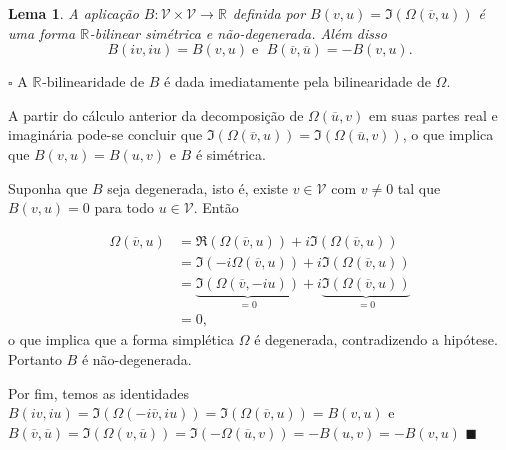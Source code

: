 \documentclass[12pt]{book}
\newtheorem{lema}[teorema]{Lema}
\newenvironment{prova}[1]{$\square$ #1}{\hfill$\blacksquare$}
\newcommand{\complexificado}[1]{\mathcal{#1}}
\newcommand{\formaSimpleticaExtendida}[2]{\Omega(#1, #2)}
\newcommand{\parteImaginaria}[1]{\Im(#1)}
\newcommand{\parteReal}[1]{\Re(#1)}
\newcommand{\real}[1]{\mathbb{R}^{#1}}
\newcommand{\reta}{\real{}}
\begin{document}
	\begin{lema}
		A aplicação $B:\complexificado{V}\times \complexificado{V} \to \reta$ definida por $B(v, u ) = \parteImaginaria{\formaSimpleticaExtendida{\overline{v}}{u}}$ é uma forma $\reta$-bilinear simétrica e não-degenerada. Além disso
		$$
		B(iv,iu) = B(v,u)\;\text{e }\;B(\overline{v},\overline{u})=-B(v,u).
		$$
	\end{lema}
	\begin{prova} 
		A $\reta$-bilinearidade de $B$ é dada imediatamente pela bilinearidade de $\Omega$. 
		
		A partir do cálculo anterior da decomposição de $\formaSimpleticaExtendida{\overline{u}}{v} $ em suas partes real e imaginária pode-se concluir que $\parteImaginaria{\formaSimpleticaExtendida{\overline{v}}{u} } = \parteImaginaria{\formaSimpleticaExtendida{\overline{u}}{v} }$, o que implica que $B(v,u) = B(u,v)$ e $B$ é simétrica.
		
		Suponha que $B$ seja degenerada, isto é, existe $v \in \complexificado{V}$ com $v\neq 0$ tal que $B(v, u ) = 0$ para todo $u \in \complexificado{V}$. Então
		
		$$
		\begin{aligned}
		\formaSimpleticaExtendida{\overline{v}}{u} &=\parteReal{\formaSimpleticaExtendida{\overline{v}}{u}} +i \parteImaginaria{\formaSimpleticaExtendida{\overline{v}}{u}} 
		\\
		&= \parteImaginaria{-i\formaSimpleticaExtendida{\overline{v}}{u}} +i \parteImaginaria{\formaSimpleticaExtendida{\overline{v}}{u}}
		\\
		&= \underbrace{\parteImaginaria{\formaSimpleticaExtendida{\overline{v}}{-iu}}}_{=0} +i \underbrace{\parteImaginaria{\formaSimpleticaExtendida{\overline{v}}{u}}}_{=0}
		\\
		&=0,
		\end{aligned}
		$$
		o que implica que a forma simplética $\Omega$ é degenerada, contradizendo a hipótese. Portanto $B$ é não-degenerada.
		
		Por fim, temos as identidades $B(iv,iu) = \parteImaginaria{\formaSimpleticaExtendida{-i\overline{v}}{iu}}= \parteImaginaria{\formaSimpleticaExtendida{\overline{v}}{u}}=B(v,u)$ e $B(\overline{v},\overline{u})  = \parteImaginaria{\formaSimpleticaExtendida{v}{\overline{u}}} = \parteImaginaria{-\formaSimpleticaExtendida{\overline{u}}{v}} = -B(u,v) = -B(v,u)$
	\end{prova}
	
\end{document}
